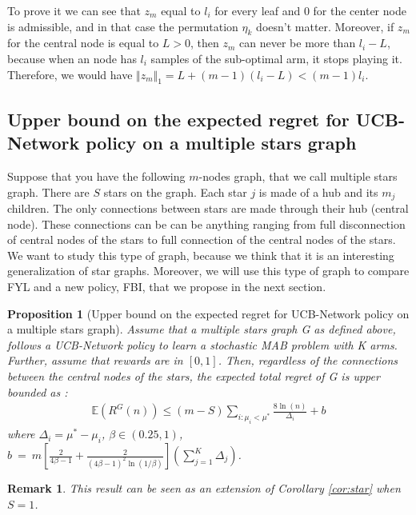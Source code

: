 \documentclass{article}
\newtheorem{proposition}{Proposition}
\newtheorem{remark}{Remark}
\begin{document}
To prove it we can see that $z_m$ equal to $l_i$ for every leaf and 0 for the center node is admissible, and in that case the permutation $\eta_k$ doesn't matter. Moreover, if $z_m$ for the central node is equal to $L > 0$, then $z_m$ can never be more than $l_i - L$, because when an node has $l_i$ samples of the sub-optimal arm, it stops playing it. Therefore, we would have $\Vert z_m \Vert_1 = L + (m-1)(l_i -L) < (m-1)l_i$.


\subsection{Upper bound on the expected regret for UCB-Network policy on a multiple stars graph}

Suppose that you have the following $m$-nodes graph, that we call multiple stars graph. There are $S$ stars on the graph. Each star $j$ is made of a hub and its $m_j$ children. The only connections between stars are made through their hub (central node). These connections can be can be anything ranging from full disconnection of central nodes of the stars to full connection of the central nodes of the stars. \\

We want to study this type of graph, because we think that it is an interesting generalization of star graphs. Moreover, we will use this type of graph to compare FYL and a new policy, FBI, that we propose in the next section. \\

\begin{proposition}[Upper bound on the expected regret for UCB-Network policy on a multiple stars graph]
  Assume that  a multiple stars graph G as defined above, follows a UCB-Network policy to learn a stochastic MAB problem with K arms. Further, assume that rewards are in $[0, 1]$. Then, regardless of the connections between the central nodes of the stars, the expected total regret of G is upper bounded as :
  \begin{align*}
    \mathbb{E}(R^G(n)) \leq \left( m - S \right) \sum_{i:\mu_i< \mu^*} \frac{8\ln(n)}{\Delta_i}  + b
  \end{align*}
  where $\Delta_i = \mu^* - \mu_i$, $\beta \in (0.25,1)$, $b~=~m \left[ \frac{2}{4\beta -1} + \frac{2}{(4\beta-1)^2 \ln(1/\beta)} \right] \left( \sum\limits_{j=1}^K \Delta_j \right)$.
\end{proposition}

\begin{remark}
  This result can be seen as an extension of Corollary \ref{cor:star} when $S = 1$.
\end{remark}
\end{document}
